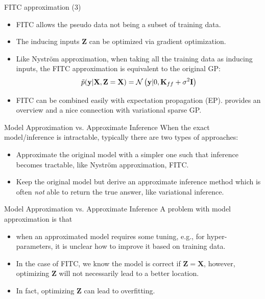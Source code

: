 \documentclass[14pt,aspectratio=1610]{beamer}
\newcommand{\yV}{\mathbf{y}}
\newcommand{\xM}{\mathbf{X}}
\newcommand{\K}{\mathbf{K}}
\newcommand{\zM}{\mathbf{Z}}
\newcommand{\I}{\mathbf{I}}
\begin{document}
\begin{frame}{FITC approximation (3)}
\begin{itemize}
\item FITC allows the pseudo data not being a subset of training data.

\item The inducing inputs $\zM$ can be optimized via gradient optimization.

\item Like Nystr\"{o}m approximation, when taking all the training data as inducing inputs, the FITC approximation is equivalent to the original GP:
\[
\tilde{p}(\yV| \xM, \zM=\xM) = \gaussianDist{\yV}{0}{\K_{ff} +\sigma^2\I}
\]
\item FITC can be combined easily with expectation propagation (EP). \cite{BuiEtAl2017} provides an overview and a nice connection with variational sparse GP.
\end{itemize}
\end{frame}

\begin{frame}{Model Approximation vs. Approximate Inference}
When the exact model/inference is intractable, typically there are two types of approaches:
\begin{itemize}
\item Approximate the original model with a simpler one such that inference becomes tractable, like Nystr\"{o}m approximation, FITC.
\item Keep the original model but derive an approximate inference method which is often \textit{not} able to return the true answer, like variational inference.
\end{itemize}

\end{frame}

\begin{frame}{Model Approximation vs. Approximate Inference}
A problem with model approximation is that 
\begin{itemize}
\item when an approximated model requires some tuning, e.g., for hyper-parameters, it is unclear how to improve it based on training data.

\item In the case of FITC, we know the model is correct if $\zM = \xM$, however, optimizing $\zM$ will not necessarily lead to a better location.

\item In fact, optimizing $\zM$ can lead to overfitting. \citep{QuinoneroRasmussen2005}
\end{itemize}

\end{frame}
\end{document}
